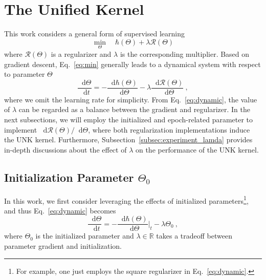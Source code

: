 \documentclass[review,10pt]{JMtemplate}
\newcommand*{\dif}{\mathop{}\!\mathrm{d}}
\begin{document}
\section{The Unified Kernel} \label{sec:unify}
This work considers a general form of supervised learning 
\begin{equation}  \label{eq:min}
    \min_{\Theta}\quad \hbar(\Theta) + \lambda \mathcal{R}( \Theta )
\end{equation}
where $\mathcal{R}( \Theta )$ is a regularizer and $\lambda$ is the corresponding multiplier. Based on gradient descent, Eq.~\eqref{eq:min} generally leads to a dynamical system with respect to parameter $\Theta$
\begin{equation}  \label{eq:dynamic}
\frac{\dif \Theta}{\dif t} =  -  \frac{\dif \hbar(\Theta)}{\dif \Theta} - \lambda \frac{\dif \mathcal{R}( \Theta ) }{\dif \Theta} \ ,
\end{equation}
where we omit the learning rate for simplicity. From Eq.~\eqref{eq:dynamic}, the value of $\lambda$ can be regarded as a balance between the gradient and regularizer. In the next subsections, we will employ the initialized and epoch-related parameter to implement ${\dif \mathcal{R}( \Theta ) }/{\dif \Theta}$, where both regularization implementations induce the UNK kernel. Furthermore, Subsection~\ref{subsec:experiment_lamda} provides in-depth discussions about the effect of $\lambda$ on the performance of the UNK kernel.


\subsection{Initialization Parameter $\Theta_0$} \label{subsec:initialization}
In this work, we first consider leveraging the effects of initialized parameters\footnote{For example, one just employs the square regularizer in Eq.~\eqref{eq:dynamic}.}, and thus Eq.~\eqref{eq:dynamic} becomes
\begin{equation}  \label{eq:lamda}
\frac{\dif \Theta}{\dif t} =  -  \frac{\dif \hbar(\Theta)}{\dif \Theta} \Big|_t - \lambda \Theta_0 \ ,
\end{equation}
where $\Theta_0$ is the initialized parameter and $\lambda \in \mathbb{R}$ takes a tradeoff between parameter gradient and initialization. 
\end{document}
